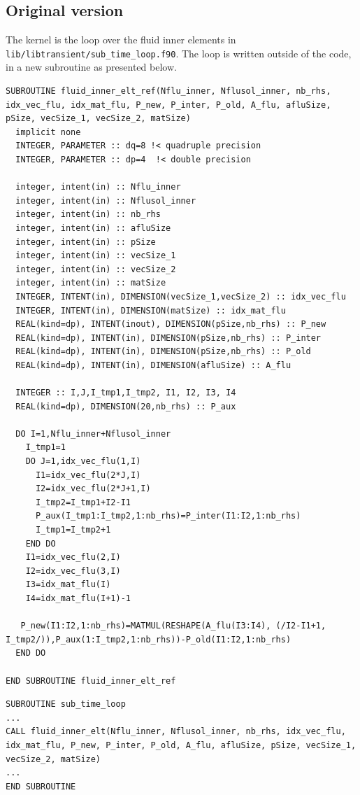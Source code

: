 \documentclass[10pt,twoside]{article}   	%
\begin{document}
\subsection{Original version}

The kernel is the loop over the fluid inner elements in \texttt{lib/libtransient/sub\_time\_loop.f90}. The loop is written outside of the code, in a new subroutine as presented below.

\lstset{language=FORTRAN}
\begin{lstlisting}[caption=kernel.f90]
SUBROUTINE fluid_inner_elt_ref(Nflu_inner, Nflusol_inner, nb_rhs, idx_vec_flu, idx_mat_flu, P_new, P_inter, P_old, A_flu, afluSize, pSize, vecSize_1, vecSize_2, matSize)
  implicit none
  INTEGER, PARAMETER :: dq=8 !< quadruple precision
  INTEGER, PARAMETER :: dp=4  !< double precision

  integer, intent(in) :: Nflu_inner
  integer, intent(in) :: Nflusol_inner
  integer, intent(in) :: nb_rhs
  integer, intent(in) :: afluSize
  integer, intent(in) :: pSize
  integer, intent(in) :: vecSize_1
  integer, intent(in) :: vecSize_2
  integer, intent(in) :: matSize
  INTEGER, INTENT(in), DIMENSION(vecSize_1,vecSize_2) :: idx_vec_flu
  INTEGER, INTENT(in), DIMENSION(matSize) :: idx_mat_flu
  REAL(kind=dp), INTENT(inout), DIMENSION(pSize,nb_rhs) :: P_new
  REAL(kind=dp), INTENT(in), DIMENSION(pSize,nb_rhs) :: P_inter
  REAL(kind=dp), INTENT(in), DIMENSION(pSize,nb_rhs) :: P_old
  REAL(kind=dp), INTENT(in), DIMENSION(afluSize) :: A_flu

  INTEGER :: I,J,I_tmp1,I_tmp2, I1, I2, I3, I4
  REAL(kind=dp), DIMENSION(20,nb_rhs) :: P_aux

  DO I=1,Nflu_inner+Nflusol_inner
    I_tmp1=1
    DO J=1,idx_vec_flu(1,I)
      I1=idx_vec_flu(2*J,I)
      I2=idx_vec_flu(2*J+1,I)
      I_tmp2=I_tmp1+I2-I1
      P_aux(I_tmp1:I_tmp2,1:nb_rhs)=P_inter(I1:I2,1:nb_rhs)
      I_tmp1=I_tmp2+1
    END DO
    I1=idx_vec_flu(2,I)
    I2=idx_vec_flu(3,I)
    I3=idx_mat_flu(I)
    I4=idx_mat_flu(I+1)-1

   P_new(I1:I2,1:nb_rhs)=MATMUL(RESHAPE(A_flu(I3:I4), (/I2-I1+1, I_tmp2/)),P_aux(1:I_tmp2,1:nb_rhs))-P_old(I1:I2,1:nb_rhs)
  END DO

END SUBROUTINE fluid_inner_elt_ref
\end{lstlisting}


\begin{lstlisting}[caption=sub\_time\_loop.f90]
SUBROUTINE sub_time_loop
...
CALL fluid_inner_elt(Nflu_inner, Nflusol_inner, nb_rhs, idx_vec_flu, idx_mat_flu, P_new, P_inter, P_old, A_flu, afluSize, pSize, vecSize_1, vecSize_2, matSize)
...
END SUBROUTINE 
\end{lstlisting}
\end{document}
